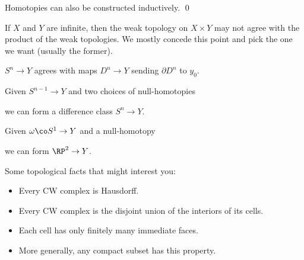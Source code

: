 \begin{corollary}
Homotopies can also be constructed inductively. \qed
\end{corollary}

\begin{remark}
If $X$ and $Y$ are infinite, then the weak topology on $X \times Y$ may not agree with the product of the weak topologies.  We mostly concede this point and pick the one we want (usually the former).
\end{remark}

\begin{example}
$S^n \to Y$ agrees with maps $D^n \to Y$ sending $\partial D^n$ to $y_0$.
\end{example}

\begin{example}
Given $S^{n-1} \to Y$ and two choices of null-homotopies
\begin{center}
\end{center}
we can form a difference class $S^n \to Y$.
\end{example}

\begin{example}
Given $\omega\co S^1 \to Y$ and a null-homotopy
\begin{center}
\end{center}
we can form $\RP^2 \to Y$.
\end{example}

Some topological facts that might interest you:
\begin{itemize}
    \item Every CW complex is Hausdorff.
    \item Every CW complex is the disjoint union of the interiors of its cells.
    \item Each cell has only finitely many immediate faces.
    \item More generally, any compact subset has this property.
\end{itemize}

